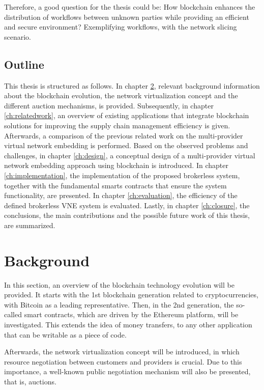 Therefore, a good question for the thesis could be: How blockchain enhances the distribution of workflows between unknown parties while providing an efficient and secure environment? Exemplifying workflows, with the network slicing scenario.

\section{Outline}

This thesis is structured as follows. In chapter \ref{ch:background}, relevant background information about the blockchain evolution, the network virtualization concept and the different auction mechanisms, is provided. Subsequently, in chapter \ref{ch:relatedwork}, an overview of existing applications that integrate blockchain solutions for improving the supply chain management efficiency is given. Afterwards, a comparison of the previous related work on the multi-provider virtual network embedding is performed. Based on the observed problems and challenges, in chapter \ref{ch:design}, a conceptual design of a multi-provider virtual network embedding approach using blockchain is introduced. In chapter \ref{ch:implementation}, the implementation of the proposed brokerless system, together with the fundamental smarts contracts that ensure the system functionality, are presented. In chapter \ref{ch:evaluation}, the efficiency of the defined brokerless VNE system is evaluated. Lastly, in chapter \ref{ch:closure}, the conclusions, the main contributions and the possible future work of this thesis, are summarized.


\chapter{Background}
\label{ch:background}

In this section, an overview of the blockchain technology evolution will be provided. It starts with the 1st blockchain generation related to cryptocurrencies, with Bitcoin as a leading representative. Then, in the 2nd generation, the so-called smart contracts, which are driven by the Ethereum platform, will be investigated. This extends the idea of money transfers, to any other application that can be writable as a piece of code.

Afterwards, the network virtualization concept will be introduced, in which resource negotiation between customers and providers is crucial. Due to this importance, a well-known public negotiation mechanism will also be presented, that is, auctions.

